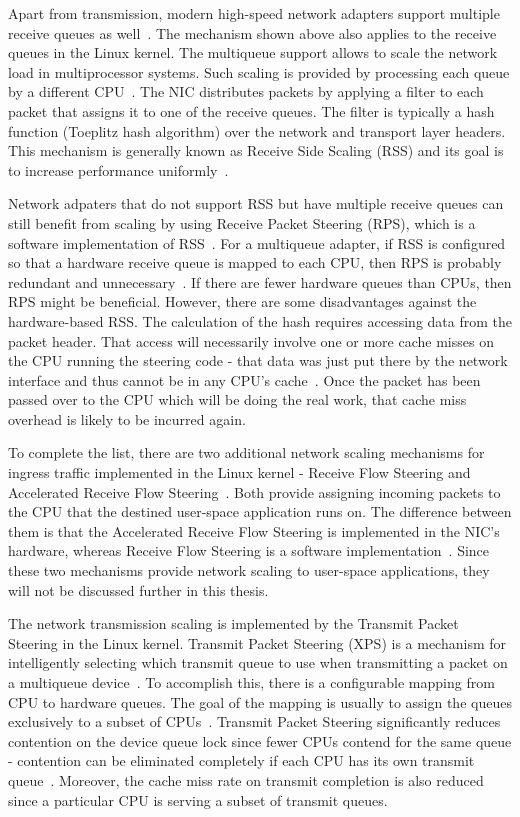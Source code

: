 Apart from transmission, modern high-speed network adapters support multiple receive queues as well~\cite{mellanox-product-brief}.
The mechanism shown above also applies to the receive queues in the Linux kernel.
The multiqueue support allows to scale the network load in multiprocessor systems.
Such scaling is provided by processing each queue by a different CPU~\cite{kernel-doc-scaling}.
The NIC distributes packets by applying a filter to each packet that assigns it to one of the receive queues.
The filter is typically a hash function (Toeplitz hash algorithm) over the network and transport layer headers.
This mechanism is generally known as Receive Side Scaling (RSS)
and its goal is to increase performance uniformly~\cite{kernel-doc-scaling}.

Network adpaters that do not support RSS but have multiple receive queues can still benefit from scaling
by using Receive Packet Steering (RPS), which is a software implementation of RSS~\cite{kernel-doc-scaling}.
For a multiqueue adapter, if RSS is configured so that a hardware
receive queue is mapped to each CPU, then RPS is probably redundant
and unnecessary~\cite{kernel-doc-scaling}.
If there are fewer hardware queues than CPUs, then
RPS might be beneficial.
However, there are some disadvantages against the hardware-based RSS.
The calculation of the hash requires accessing data from the packet header.
That access will necessarily involve one or more cache misses on the CPU running the steering code -
that data was just put there by the network interface and thus cannot be in any CPU's cache~\cite{receive-packet-steering}.
Once the packet has been passed over to the CPU which will be doing the real work,
that cache miss overhead is likely to be incurred again.

To complete the list, there are two additional network scaling mechanisms for ingress traffic implemented in the Linux kernel - 
Receive Flow Steering and Accelerated Receive Flow Steering~\cite{kernel-doc-scaling}.
Both provide assigning incoming packets to the CPU that the destined user-space application runs on.
The difference between them is that the Accelerated Receive Flow Steering is implemented in the NIC's hardware,
whereas Receive Flow Steering is a software implementation~\cite{kernel-doc-scaling}.
Since these two mechanisms provide network scaling to user-space applications, they will not be discussed further in
this thesis.

The network transmission scaling is implemented by the
Transmit Packet Steering in the Linux kernel.
Transmit Packet Steering (XPS) is a mechanism for intelligently selecting
which transmit queue to use when transmitting a packet on a multiqueue device~\cite{kernel-source}.
To accomplish this, there is a configurable mapping from CPU to hardware queues.
The goal of the mapping is usually to assign the queues exclusively to a subset of CPUs~\cite{kernel-doc-scaling}.
Transmit Packet Steering significantly reduces
contention on the device queue lock since fewer CPUs contend for the same queue -
contention can be eliminated completely if each CPU has its own transmit queue~\cite{kernel-doc-scaling}.
Moreover, the cache miss rate on transmit completion is also reduced since a particular CPU
is serving a subset of transmit queues.

